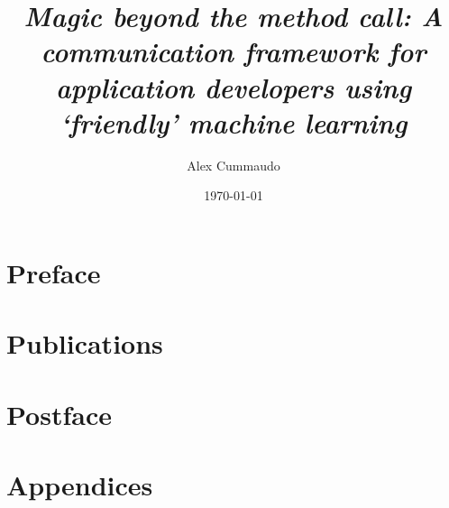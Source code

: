 \documentclass[twoside,12pt,titlepage]{book}
\title{
  \itshape Magic beyond the method call:            %
  \upshape A communication framework                %
           for application developers               %
           using `friendly' machine learning        %
}
\author{Alex Cummaudo}
\date{\today}
\begin{document}
\frontmatter







\mainmatter

\part{Preface}
\begin{bibunit}
  
  
  
  
\end{bibunit}

\part{Publications}




\part{Postface}
\begin{bibunit}
  
\end{bibunit}

\appendix

\part{Appendices}
\begin{bibunit}
  
  
  
\end{bibunit}
\end{document}
